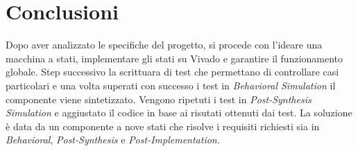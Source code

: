 \documentclass{article}
\begin{document}
	\pagebreak
	
	\section{Conclusioni}
	Dopo aver analizzato le specifiche del progetto, si procede con l'ideare una macchina a stati, implementare gli stati su Vivado e garantire il funzionamento globale. Step successivo la scrittuara di test che permettano di controllare casi particolari e una volta superati con successo i test in \textit{Behavioral Simulation} il componente viene sintetizzato. Vengono ripetuti i test in \textit{Post-Synthesis Simulation} e aggiustato il codice in base ai risutati ottenuti dai test. La soluzione \`{e} data da un componente a nove stati che risolve i requisiti richiesti sia in \textit{Behavioral}, \textit{Post-Synthesis} e \textit{Post-Implementation}.
	
	
	
	
	 
	\pagebreak
	
\end{document}
